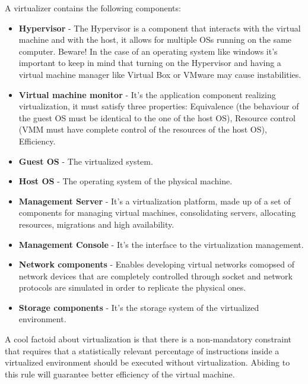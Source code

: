 A virtualizer contains the following components:
\begin{itemize}
    \item \textbf{Hypervisor} - The Hypervisor is a component that interacts with the virtual machine and with the host, it allows for multiple OSs running on the same computer. Beware! In the case of an operating system like windows it's important to keep in mind that turning on the Hypervisor and having a virtual machine manager like Virtual Box or VMware may cause instabilities.
    \item \textbf{Virtual machine monitor} - It's the application component realizing virtualization, it must satisfy three properties: Equivalence (the behaviour of the guest OS must be identical to the one of the host OS), Resource control (VMM must have complete control of the resources of the host OS), Efficiency.
    \item \textbf{Guest OS} - The virtualized system.
    \item \textbf{Host OS} - The operating system of the physical machine.
    \item \textbf{Management Server} - It's a virtualization platform, made up of a set of components for managing virtual machines, consolidating servers, allocating resources, migrations and high availability.
    \item \textbf{Management Console} - It's the interface to the virtualization management.
    \item \textbf{Network components} - Enables developing virtual networks comopsed of network devices that are completely controlled through socket and network protocols are simulated in order to replicate the physical ones.
    \item \textbf{Storage components} - It's the storage system of the virtualized environment.
\end{itemize}
A cool factoid about virtualization is that there is a non-mandatory constraint that requires that a statistically relevant percentage of instructions inside a virtualized environment should be executed without virtualization. Abiding to this rule will guarantee better efficiency of the virtual machine.

